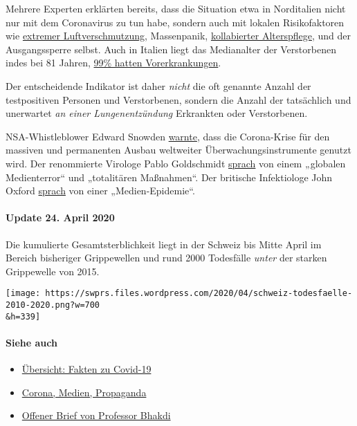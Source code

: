 Mehrere Experten erklärten bereits, dass die Situation etwa in
Norditalien nicht nur mit dem Coronavirus zu tun habe, sondern auch mit
lokalen Risikofaktoren wie
\href{https://www.srf.ch/news/international/massive-schadstoffbelastung-nirgendwo-erkranken-so-viele-wegen-smog-wie-in-norditalien}{extremer
Luft­ver­schmutzung}, Massenpanik,
\href{https://swprs.org/covid19-bericht-aus-italien/}{kollabierter
Alterspflege}, und der Ausgangssperre selbst. Auch in Italien liegt das
Medianalter der Verstorbenen indes bei 81 Jahren,
\href{https://www.bloomberg.com/news/articles/2020-03-18/99-of-those-who-died-from-virus-had-other-illness-italy-says}{99\%
hatten Vorerkrankungen}.

Der entscheidende Indikator ist daher \emph{nicht} die oft genannte
Anzahl der testpositiven Personen und Verstorbenen, sondern die Anzahl
der tatsächlich und unerwartet \emph{an einer Lungen­ent­zündung}
Erkrankten oder Verstorbenen.

NSA-Whistleblower Edward Snowden
\href{https://www.youtube.com/watch?v=-pcQFTzck_c}{warnte}, dass die
Corona-Krise für den massiven und permanenten Ausbau weltweiter
Überwachungs­instrumente genutzt wird. Der renommierte Virologe Pablo
Goldschmidt
\href{https://www.rubikon.news/artikel/der-corona-totalitarismus}{sprach}
von einem „globalen Medienterror`` und „totalitären Maßnahmen``. Der
britische Infektiologe John Oxford
\href{https://novuscomms.com/2020/03/31/a-view-from-the-hvivo-open-orphan-orph-laboratory-professor-john-oxford/}{sprach}
von einer „Medien-Epidemie``.

\hypertarget{update-24-april-2020}{%
\paragraph{Update 24. April 2020}\label{update-24-april-2020}}

Die kumulierte Gesamtsterblichkeit liegt in der Schweiz bis Mitte April
im Bereich bisheriger Grippewellen und rund 2000 Todesfälle \emph{unter}
der starken Grippewelle von 2015.

\texttt{[image: https://swprs.files.wordpress.com/2020/04/schweiz-todesfaelle-2010-2020.png?w=700\\\&h=339]}

\hypertarget{siehe-auch}{%
\paragraph{Siehe auch}\label{siehe-auch}}

\begin{itemize}
\tightlist
\item
  \href{https://swprs.org/covid-19-hinweis-ii/}{Übersicht: Fakten zu
  Covid-19}
\item
  \href{https://swprs.org/corona-medien-propaganda/}{Corona, Medien,
  Propaganda}
\item
  \href{https://swprs.org/offener-brief-von-professor-sucharit-bhakdi-an-bundeskanzlerin-dr-angela-merkel/}{Offener
  Brief von Professor Bhakdi}
\end{itemize}

